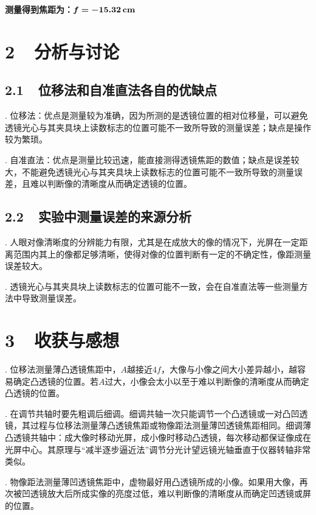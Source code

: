 \documentclass{ctexbook}
\begin{document}
    \noindent \textbf{测量得到焦距为：}$\bm{f = -} \textbf{15.32\,cm}$

    \newpage
    \section*{ 2\ \ 分析与讨论}
    \bigskip

    \subsection*{ 2.1\ \ 位移法和自准直法各自的优缺点}

    . 位移法：优点是测量较为准确，因为所测的是透镜位置的相对位移量，可以避免透镜光心与其夹具块上读数标志的位置可能不一致所导致的测量误差；缺点是操作较为繁琐。
    \medskip

    . 自准直法：优点是测量比较迅速，能直接测得透镜焦距的数值；缺点是误差较大，不能避免透镜光心与其夹具块上读数标志的位置可能不一致所导致的测量误差，且难以判断像的清晰度从而确定透镜的位置。

    \bigskip
    \subsection*{ 2.2\ \ 实验中测量误差的来源分析}

    . 人眼对像清晰度的分辨能力有限，尤其是在成放大的像的情况下，光屏在一定距离范围内其上的像都足够清晰，使得对像的位置判断有一定的不确定性，像距测量误差较大。
    \medskip

    . 透镜光心与其夹具块上读数标志的位置可能不一致，会在自准直法等一些测量方法中导致测量误差。

    \newpage
    \section*{ 3\ \ 收获与感想}
    \bigskip

    . 位移法测量薄凸透镜焦距中，$A$越接近$4f$，大像与小像之间大小差异越小，越容易确定凸透镜的位置。若$A$过大，小像会太小以至于难以判断像的清晰度从而确定凸透镜的位置。
    \medskip

    . 在调节共轴时要先粗调后细调。细调共轴一次只能调节一个凸透镜或一对凸凹透镜，其过程与位移法测量薄凸透镜焦距或物像距法测量薄凹透镜焦距相同。细调薄凸透镜共轴中：成大像时移动光屏，成小像时移动凸透镜，每次移动都保证像成在光屏中心。其原理与“减半逐步逼近法”调节分光计望远镜光轴垂直于仪器转轴非常类似。
    \medskip

    . 物像距法测量薄凹透镜焦距中，虚物最好用凸透镜所成的小像。如果用大像，再次被凹透镜放大后所成实像的亮度过低，难以判断像的清晰度从而确定凹透镜或屏的位置。
\end{document}
